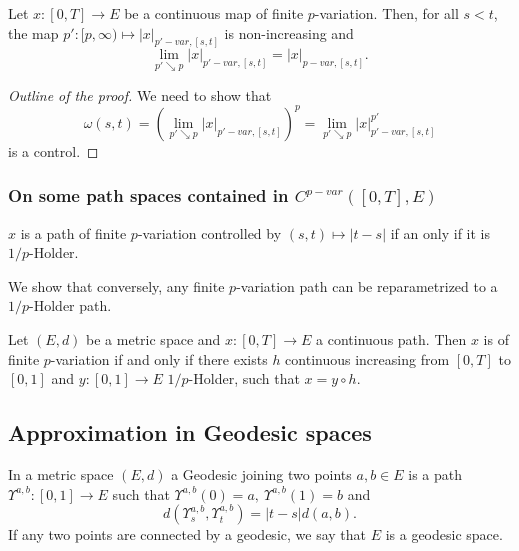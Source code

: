 \begin{lemma}
    Let $x:[0,T] \rightarrow E$ be a continuous map of finite $p$-variation. Then, for all $s < t$, the map $p':[p,\infty) \mapsto |x|_{p'-var,[s,t]}$ is non-increasing and 
    \begin{equation}
        \lim_{p' \searrow p} |x|_{p'-var, [s,t]} = |x|_{p-var, [s,t]}.
    \end{equation}
\end{lemma}
\begin{proof}[Outline of the proof]
    We need to show that 
    \begin{equation}
    \omega(s,t) = \left( \lim_{p' \searrow p} |x|_{p'-var, [s,t]} \right)^p = \lim_{p' \searrow p} |x|_{p'-var, [s,t]}^{p'}
    \end{equation}
    is a control.
\end{proof}

\subsubsection{On some path spaces contained in $C^{p-var}([0,T], E)$}

\begin{observation}
    $x$ is a path of finite $p$-variation controlled by $(s,t) \mapsto |t - s|$ if an only if it is $1/p$-Holder.
\end{observation}

We show that conversely, any finite $p$-variation path can be reparametrized to a $1/p$-Holder path.

\begin{proposition}
    Let $(E,d)$ be a metric space and $x:[0,T] \rightarrow E$ a continuous path.
    Then $x$ is of finite $p$-variation if and only if there exists $h$ continuous increasing from $[0,T]$ to $[0,1]$ and $y:[0,1]\rightarrow E$ $1/p$-Holder, such that $x = y \circ h.$
\end{proposition}

\subsection{Approximation in Geodesic spaces}

\begin{definition}
    In a metric space $(E,d)$ a Geodesic joining two points $a,b \in E$ is a path $\Upsilon^{a,b}:[0,1] \rightarrow E$ such that $\Upsilon^{a,b}(0) = a,\ \Upsilon^{a,b}(1) = b$ and 
    \begin{equation}
        d \left( \Upsilon^{a,b}_s, \Upsilon^{a,b}_t \right) = |t - s| d(a,b).
    \end{equation} 
    If any two points are connected by a geodesic, we say that $E$ is a geodesic space.
\end{definition}

